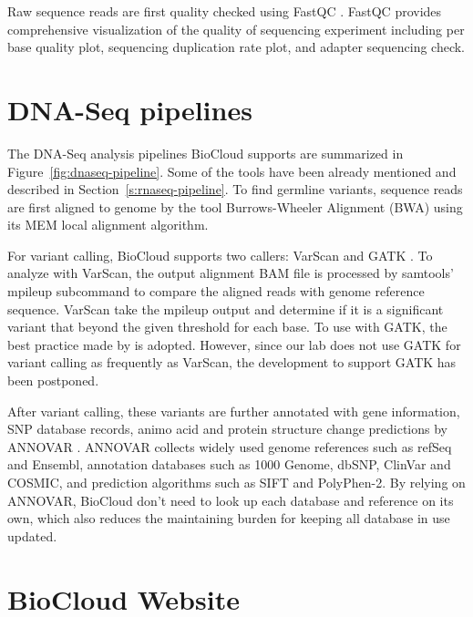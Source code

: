 Raw sequence reads are first quality checked using FastQC \cite{:fastqc}.
FastQC provides comprehensive visualization of the quality of sequencing
experiment including per base quality plot, sequencing duplication rate plot,
and adapter sequencing check.



\section{DNA-Seq pipelines}
\label{s:dnaseq-pipeline}

The DNA-Seq analysis pipelines BioCloud supports are summarized in
Figure~\ref{fig:dnaseq-pipeline}. Some of the tools have been already mentioned
and described in Section~\ref{s:rnaseq-pipeline}. To find germline variants,
sequence reads are first aligned to genome by the tool Burrows-Wheeler
Alignment (BWA) \cite{li2009:fast} using its MEM local alignment algorithm.



For variant calling, BioCloud supports two callers: VarScan
\cite{koboldt2012:varscan} and GATK
\cite{vanderauwera2013:fastq,mckenna2010:genome}. To analyze with VarScan, the
output alignment BAM file is processed by samtools' mpileup subcommand to
compare the aligned reads with genome reference sequence. VarScan take the
mpileup output and determine if it is a significant variant that beyond the
given threshold for each base. To use with GATK, the best practice
\cite{vanderauwera2013:fastq} made by \citeauthor{vanderauwera2013:fastq} is
adopted. However, since our lab does not use GATK for variant calling as
frequently as VarScan, the development to support GATK has been postponed.

After variant calling, these variants are further annotated with gene
information, SNP database records, animo acid and protein structure change
predictions by ANNOVAR \cite{wang2010:annovar}. ANNOVAR collects widely used
genome references such as refSeq and Ensembl, annotation databases such as 1000
Genome, dbSNP, ClinVar and COSMIC, and prediction algorithms such as SIFT and
PolyPhen-2. By relying on ANNOVAR, BioCloud don't need to look up each database
and reference on its own, which also reduces the maintaining burden for keeping
all database in use updated.



\section{BioCloud Website}
\label{s:biocloud-website}

